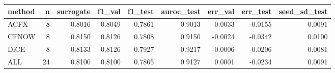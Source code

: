 \begin{tabular}{lrrrrrrrr}
\toprule
method &  n &  surrogate &  f1\_val &  f1\_test &  auroc\_test &  err\_val &  err\_test &  seed\_sd\_test \\
\midrule
  ACFX &  8 &     0.8016 &  0.8049 &   0.7861 &      0.9013 &   0.0033 &   -0.0155 &        0.0091 \\
 CFNOW &  8 &     0.8150 &  0.8126 &   0.7808 &      0.9150 &  -0.0024 &   -0.0342 &        0.0100 \\
  DiCE &  8 &     0.8133 &  0.8126 &   0.7927 &      0.9217 &  -0.0006 &   -0.0206 &        0.0081 \\
   ALL & 24 &     0.8100 &  0.8100 &   0.7865 &      0.9127 &   0.0001 &   -0.0234 &        0.0091 \\
\bottomrule
\end{tabular}
